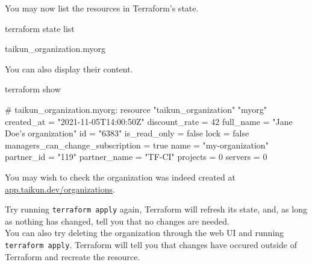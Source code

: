 You may now list the resources in Terraform's state.
\begin{shell}
terraform state list
\end{shell}
\begin{raw}
taikun_organization.myorg
\end{raw}
You can also display their content.
\begin{shell}
terraform show
\end{shell}
\begin{raw}
# taikun_organization.myorg:
resource "taikun_organization" "myorg" {
    created_at                       = "2021-11-05T14:00:50Z"
    discount_rate                    = 42
    full_name                        = "Jane Doe's organization"
    id                               = "6383"
    is_read_only                     = false
    lock                             = false
    managers_can_change_subscription = true
    name                             = "my-organization"
    partner_id                       = "119"
    partner_name                     = "TF-CI"
    projects                         = 0
    servers                          = 0
}
\end{raw}
You may wish to check the organization was indeed created at
\href{https://app.taikun.dev/organizations}{app.taikun.dev/organizations}.
\begin{tip}
Try running \texttt{terraform apply} again, Terraform will refresh its state, and, as long as
nothing has changed, tell you that no changes are needed.\\

You can also try deleting the organization through the web UI and running \texttt{terraform apply}.
Terraform will tell you that changes have occured outside of Terraform and recreate the resource.
\end{tip}
